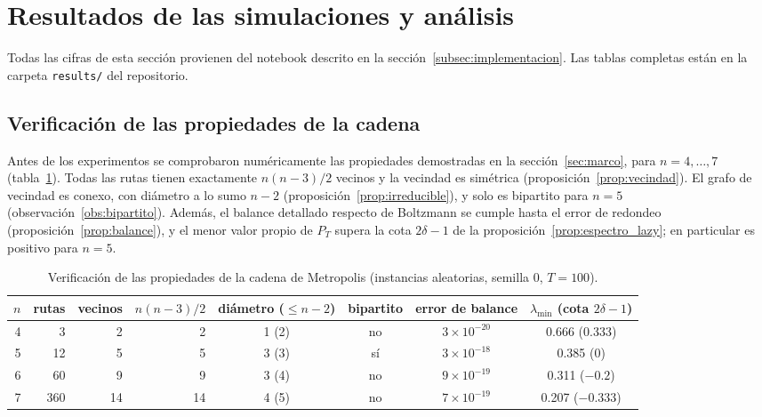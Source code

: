 
\section{Resultados de las simulaciones y análisis}
\label{sec:resultados}

Todas las cifras de esta sección provienen del notebook descrito en la
sección~\ref{subsec:implementacion}. Las tablas completas están en la
carpeta \texttt{results/} del repositorio.

\subsection{Verificación de las propiedades de la cadena}
\label{subsec:res_verificacion}

Antes de los experimentos se comprobaron numéricamente las propiedades
demostradas en la sección~\ref{sec:marco}, para \(n=4,\ldots,7\)
(tabla~\ref{tab:verificacion}). Todas las rutas tienen exactamente
\(n(n-3)/2\) vecinos y la vecindad es simétrica
(proposición~\ref{prop:vecindad}). El grafo de vecindad es conexo, con
diámetro a lo sumo \(n-2\) (proposición~\ref{prop:irreducible}), y solo
es bipartito para \(n=5\) (observación~\ref{obs:bipartito}). Además, el
balance detallado respecto de Boltzmann se cumple hasta el error de
redondeo (proposición~\ref{prop:balance}), y el menor valor propio de
\(P_T\) supera la cota \(2\delta-1\) de la
proposición~\ref{prop:espectro_lazy}; en particular es positivo para
\(n=5\).

\begin{table}[H]
\centering
\small
\begin{tabular}{@{}rrrrcccc@{}}
\toprule
\(n\) & rutas & vecinos & \(n(n-3)/2\) & diámetro (\(\le n-2\)) & bipartito
& error de balance & \(\lambda_{\min}\) (cota \(2\delta-1\)) \\
\midrule
4 &   3 &  2 &  2 & 1 (2) & no & \(3\times10^{-20}\) & 0.666 (0.333) \\
5 &  12 &  5 &  5 & 3 (3) & sí & \(3\times10^{-18}\) & 0.385 (0) \\
6 &  60 &  9 &  9 & 3 (4) & no & \(9\times10^{-19}\) & 0.311 (\(-0.2\)) \\
7 & 360 & 14 & 14 & 4 (5) & no & \(7\times10^{-19}\) & 0.207 (\(-0.333\)) \\
\bottomrule
\end{tabular}
\caption{Verificación de las propiedades de la cadena de Metropolis
(instancias aleatorias, semilla 0, \(T=100\)).}
\label{tab:verificacion}
\end{table}


